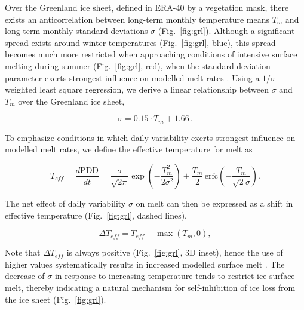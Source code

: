 \documentclass[review]{igs}
\begin{document}
Over the Greenland ice sheet, defined in ERA-40 by a vegetation mask, there exists an anticorrelation between long-term monthly temperature means $T_{m}$ and long-term monthly standard deviations $\sigma$ (Fig.~\ref{fig:grl}). Although a significant spread exists around winter temperatures (Fig.~\ref{fig:grl}, blue), this spread becomes much more restricted when approaching conditions of intensive surface melting during summer (Fig.~\ref{fig:grl}, red), when the standard deviation parameter exerts strongest influence on modelled melt rates \citep{rogozhina-rau-inpress}. Using a $1/\sigma$-weighted least square regression, we derive a linear relationship between $\sigma$ and $T_{m}$ over the Greenland ice sheet,

\begin{equation} \label{eq:sigma}
    \sigma = 0.15 \cdot T_{m} + 1.66\,.
\end{equation}

To emphasize conditions in which daily variability exerts strongest influence on modelled melt rates, we define the effective temperature for melt as

\begin{equation} \label{eq:teff}
    T_{eff} = \frac{d\mathrm{PDD}}{dt}
        = \frac{\sigma}{\sqrt{2\pi}} \exp\left({-\frac{T_{m}^2}{2\sigma^2}}\right)
            + \frac{T_{m}}{2} \, \mathrm{erfc} \left(-\frac{T_{m}}{\sqrt{2}\sigma}\right).
\end{equation}

The net effect of daily variability $\sigma$ on melt can then be expressed as a shift in effective temperature (Fig.~\ref{fig:grl}, dashed lines),

\begin{equation} \label{eq:dteff}
    \Delta T_{eff} = T_{eff} - \max(T_{m}, 0),
\end{equation}

Note that $\Delta T_{eff}$ is always positive (Fig.~\ref{fig:grl}, 3D inset), hence the use of higher values systematically results in increased modelled surface melt \citep{rogozhina-rau-inpress}. The decrease of $\sigma$ in response to increasing temperature tends to restrict ice surface melt, thereby indicating a natural mechanism for self-inhibition of ice loss from the ice sheet (Fig.~\ref{fig:grl}).
\end{document}
